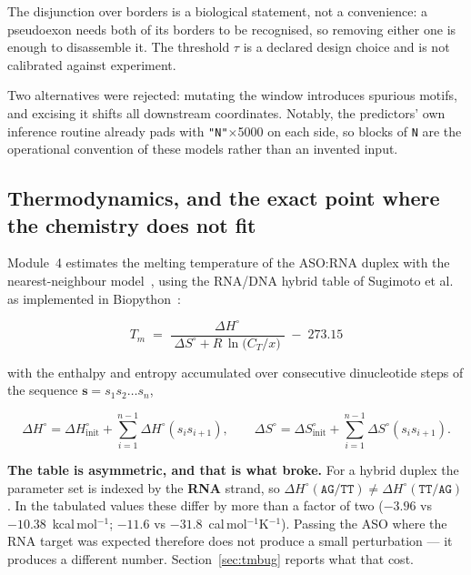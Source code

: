 \documentclass[11pt,a4paper]{article}
\begin{document}
The disjunction over borders is a biological statement, not a convenience: a pseudoexon needs both
of its borders to be recognised, so removing either one is enough to disassemble it. The threshold
$\tau$ is a declared design choice and is not calibrated against experiment.

Two alternatives were rejected: mutating the window introduces spurious motifs, and excising it
shifts all downstream coordinates. Notably, the predictors' own inference routine already pads with
\texttt{"N"}$\times$5000 on each side, so blocks of \texttt{N} are the operational convention of
these models rather than an invented input.

\subsection{Thermodynamics, and the exact point where the chemistry does not fit}
\label{sec:thermo}

Module~4 estimates the melting temperature of the ASO:RNA duplex with the nearest-neighbour
model~\cite{santalucia1998}, using the RNA/DNA hybrid table of Sugimoto et
al.~\cite{sugimoto1995} as implemented in Biopython~\cite{cock2009}:

\begin{equation}
T_m \;=\; \frac{\Delta H^\circ}{\;\Delta S^\circ + R\,\ln\!\bigl(C_T/x\bigr)\;} \;-\; 273.15
\label{eq:tm}
\end{equation}

with the enthalpy and entropy accumulated over consecutive dinucleotide steps of the sequence
$\bm{s}=s_1s_2\ldots s_n$,

\begin{equation}
\Delta H^\circ = \Delta H^\circ_{\mathrm{init}} + \sum_{i=1}^{n-1} \Delta H^\circ(s_i s_{i+1}),
\qquad
\Delta S^\circ = \Delta S^\circ_{\mathrm{init}} + \sum_{i=1}^{n-1} \Delta S^\circ(s_i s_{i+1}).
\label{eq:nn}
\end{equation}

\textbf{The table is asymmetric, and that is what broke.} For a hybrid duplex the parameter set is
indexed by the \textbf{RNA} strand, so $\Delta H^\circ(\mathtt{AG/TT}) \neq
\Delta H^\circ(\mathtt{TT/AG})$. In the tabulated values these differ by more than a factor of two
($-3.96$ vs $-10.38$~kcal\,mol$^{-1}$; $-11.6$ vs $-31.8$~cal\,mol$^{-1}$K$^{-1}$). Passing the ASO
where the RNA target was expected therefore does not produce a small perturbation --- it produces a
different number. Section~\ref{sec:tmbug} reports what that cost.
\end{document}
